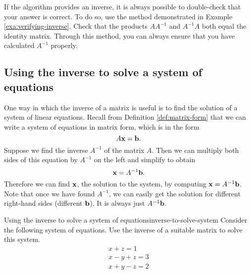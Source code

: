 If the algorithm provides an inverse, it is always possible to
double-check that your answer is correct.  To do so, use the method
demonstrated in Example \ref{exa:verifying-inverse}. Check that the
products $AA^{-1}$ and $A^{-1}A$ both equal the identity
matrix. Through this method, you can always ensure that you have
calculated $A^{-1}$ properly.

\subsection{Using the inverse to solve a system of equations}

One way in which the inverse of a matrix is useful is to find the
solution of a system of linear equations.  Recall from Definition
\ref{def:matrix-form} that we can write a system of equations in
matrix form, which is in the form
\begin{equation*}
  A\mbox{\bf x}=\mbox{\bf b}.
\end{equation*}
Suppose we find the inverse $A^{-1}$ of the matrix $A$. Then we can
multiply both sides of this equation by $A^{-1}$ on the left and
simplify to obtain
\begin{equation*}
  \mbox{\bf x} = A^{-1}\mbox{\bf b}.
\end{equation*}
Therefore we can find $\mbox{\bf x}$, the solution to the system, by
computing $\mbox{\bf x} = A^{-1}\mbox{\bf b}$. Note that once we have found
$A^{-1}$, we can easily get the solution for different right-hand
sides (different $\mbox{\bf b}$). It is always just $A^{-1}\mbox{\bf b}$.

\begin{example}{Using the inverse to solve a system of equations}{inverse-to-solve-system}
  Consider the following system of equations. Use the inverse of a
  suitable matrix to solve this system.
  \begin{equation*}
    \begin{array}{c}
      x+z=1 \\
      x-y+z=3 \\
      x+y-z=2
    \end{array}
  \end{equation*}
\end{example}

